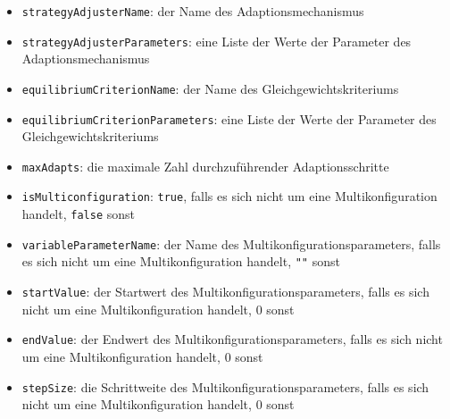 \documentclass[parskip=full,11pt]{scrartcl}
\begin{document}
\begin{itemize}
\item[] \texttt{strategyAdjusterName}: der Name des Adaptionsmechanismus
\item[] \texttt{strategyAdjusterParameters}: eine Liste der Werte der Parameter des Adaptionsmechanismus
\item[] \texttt{equilibriumCriterionName}: der Name des Gleichgewichtskriteriums
\item[] \texttt{equilibriumCriterionParameters}: eine Liste der Werte der Parameter des Gleichgewichtskriteriums
\item[] \texttt{maxAdapts}: die maximale Zahl durchzuführender Adaptionsschritte
\item[] \texttt{isMulticonfiguration}: \texttt{true}, falls es sich nicht um eine Multikonfiguration handelt, \texttt{false} sonst
\item[] \texttt{variableParameterName}: der Name des Multikonfigurationsparameters, falls es sich nicht um eine Multikonfiguration handelt, \texttt{""} sonst
\item[] \texttt{startValue}: der Startwert des Multikonfigurationsparameters, falls es sich nicht um eine Multikonfiguration handelt, \(0\) sonst
\item[] \texttt{endValue}: der Endwert des Multikonfigurationsparameters, falls es sich nicht um eine Multikonfiguration handelt, \(0\) sonst
\item[] \texttt{stepSize}: die Schrittweite des Multikonfigurationsparameters, falls es sich nicht um eine Multikonfiguration handelt, \(0\) sonst
\end{itemize}
\end{document}
